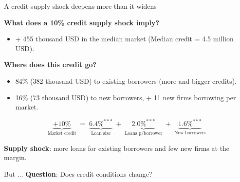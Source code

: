 \documentclass[aspectratio=169]{beamer}
\begin{document}
\begin{frame}{A credit supply shock deepens more than it widens}
 
\textbf{What does a 10\% credit supply shock imply?}
 
\begin{itemize}
    \item + 455 thousand USD in the median market (Median credit = 4.5 million USD).
\end{itemize}
 
\pause
\vspace{4mm}
 
\textbf{Where does this credit go?}
 
\begin{itemize}
    \item 84\% (382 thousand USD) to existing borrowers (more and bigger credits).
    \item 16\% (73 thousand USD) to new borrowers, + 11 new firms borrowing per market.
\end{itemize}
 
\[
\underbrace{+10\%}_{\text{Market credit}} \;=\; \underbrace{6.4\%^{***}}_{\text{Loan size}} \;+\;
\underbrace{2.0\%^{***}}_{\text{Loans p/borrower}} \;+\;
\underbrace{1.6\%^{***}}_{\text{New borrowers}}
\]
 
\vspace{2mm}
 
\begin{center}
    \large \textbf{Supply shock}: more loans for existing borrowers and few new firms at the margin.

    \vspace{3mm}
    \pause

    \large But $\dots$ \textbf{Question}: Does credit conditions change?
\end{center}

\end{frame}
 
 
\end{document}
